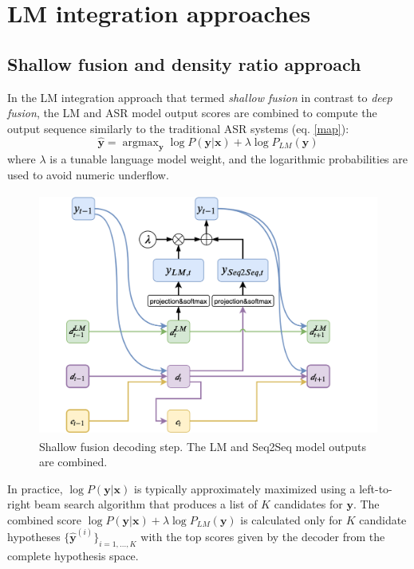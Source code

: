 \documentclass[11pt]{article}
\DeclareMathOperator*{\argmax}{argmax}
\begin{document}
\section{LM integration approaches}
\subsection{Shallow fusion and density ratio approach}
In the LM integration approach that \citep{gulcehre2015using} termed \emph{shallow fusion} in contrast to \emph{deep fusion}, the LM and ASR model output scores are combined to compute the output sequence similarly to the traditional ASR systems (eq. \ref{map}):
\begin{equation}
    \hat{\boldsymbol{y}} = \argmax_{\boldsymbol{y}} \log P(\boldsymbol{y}|\boldsymbol{x}) + \lambda \log P_{LM}(\boldsymbol{y}) \label{shallowfusion}
\end{equation}
where $\lambda$ is a tunable language model weight, and the logarithmic probabilities are used to avoid numeric underflow.

\begin{figure}[htb]
    \begin{center}
        \includegraphics[height=8cm]{shallow.png}
    \end{center}
    \caption{Shallow fusion decoding step. The LM and Seq2Seq model outputs are combined.}
    \label{deepfusion}
\end{figure}

In practice,  $\log P(\boldsymbol{y}|\boldsymbol{x})$ is typically approximately maximized using a left-to-right beam search algorithm that produces a list of $K$ candidates for $\boldsymbol{y}$.
The combined score $\log P(\boldsymbol{y}|\boldsymbol{x}) + \lambda \log P_{LM}(\boldsymbol{y})$ is calculated only for $K$ candidate hypotheses $\{\hat{\boldsymbol{y}}^{(i)}\}_{i=1,...,K}$ with the top scores given by the decoder from the complete hypothesis space.
\end{document}
